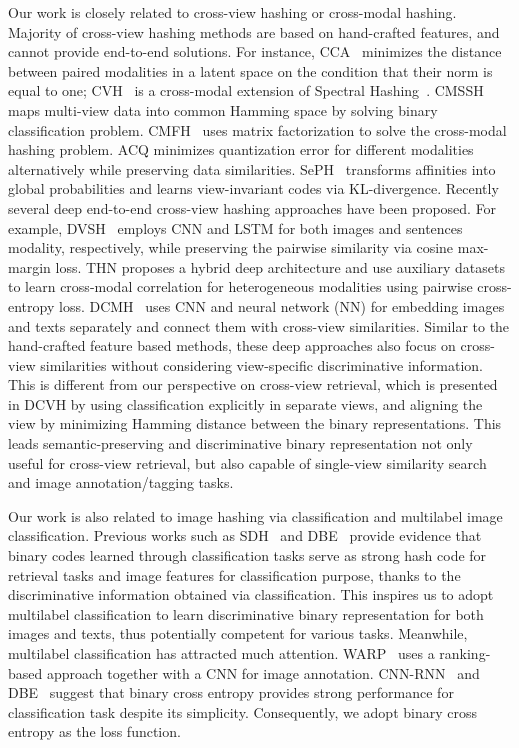 \documentclass[10pt,twocolumn,letterpaper]{article}
\begin{document}
Our work is closely related to cross-view hashing or cross-modal hashing. Majority of cross-view hashing methods are based on hand-crafted features, and cannot provide end-to-end solutions. For instance, CCA~\cite{Hardoon:2004:CCA:1119696.1119703} minimizes the distance between paired modalities in a latent space on the condition that their norm is equal to one; CVH~\cite{cvh} is a cross-modal extension of Spectral Hashing~\cite{spectralhashing}. CMSSH~\cite{spectralhashing} maps multi-view data into common Hamming space by solving binary classification problem. CMFH~\cite{cmfh} uses matrix factorization to solve the cross-modal hashing problem. ACQ\cite{acq} minimizes quantization error for different modalities alternatively while preserving data similarities. SePH~\cite{seph} transforms affinities into global probabilities and learns view-invariant codes via KL-divergence. Recently several deep end-to-end cross-view hashing approaches have been proposed. For example, DVSH~\cite{dvsh} employs CNN and LSTM for both images and sentences modality, respectively, while preserving the pairwise similarity via cosine max-margin loss. THN\cite{THN} proposes a hybrid deep architecture and use auxiliary datasets to learn cross-modal correlation for heterogeneous modalities using pairwise cross-entropy loss. DCMH~\cite{dcmh} uses CNN and neural network (NN) for embedding images and texts separately and connect them with cross-view similarities. Similar to the hand-crafted feature based methods, these deep approaches also focus on cross-view similarities without considering view-specific discriminative information. This is different from our perspective on cross-view retrieval, which is presented in DCVH by using classification explicitly in separate views, and aligning the view by minimizing Hamming distance between the binary representations. This leads semantic-preserving and discriminative binary representation not only useful for cross-view retrieval, but also capable of single-view similarity search and image annotation/tagging tasks.

Our work is also related to image hashing via classification and multilabel image classification. Previous works such as SDH~\cite{Shen_2015_CVPR} and DBE~\cite{dbe} provide evidence that binary codes learned through classification tasks serve as strong hash code for retrieval tasks and image features for classification purpose, thanks to the discriminative information obtained via classification. This inspires us to adopt multilabel classification to learn discriminative binary representation for both images and texts, thus potentially competent for various tasks. Meanwhile, multilabel classification has attracted much attention. WARP~\cite{warp} uses a ranking-based approach together with a CNN for image annotation. CNN-RNN~\cite{Wang_2016_CVPR} and DBE~\cite{dbe} suggest that binary cross entropy provides strong performance for classification task despite its simplicity. Consequently, we adopt binary cross entropy as the loss function.
\end{document}
